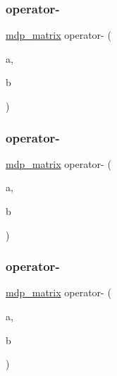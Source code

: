 \mbox{\label{classmdp__matrix_a60f405280a02350fdc22b1b8b86712c6}} 
\subsubsection{\texorpdfstring{operator-\/}{operator-}\hspace{0.1cm}{\footnotesize\ttfamily [2/6]}}
{\footnotesize\ttfamily \hyperlink{classmdp__matrix}{mdp\+\_\+matrix} operator-\/ (\begin{DoxyParamCaption}\item[{const \hyperlink{classmdp__matrix}{mdp\+\_\+matrix} \&}]{a,  }\item[{const \hyperlink{classmdp__matrix}{mdp\+\_\+matrix} \&}]{b }\end{DoxyParamCaption})\hspace{0.3cm}{\ttfamily [friend]}}

\mbox{\label{classmdp__matrix_ad5af014fcf319974b767e466ebbe0a41}} 
\subsubsection{\texorpdfstring{operator-\/}{operator-}\hspace{0.1cm}{\footnotesize\ttfamily [3/6]}}
{\footnotesize\ttfamily \hyperlink{classmdp__matrix}{mdp\+\_\+matrix} operator-\/ (\begin{DoxyParamCaption}\item[{const \hyperlink{classmdp__matrix}{mdp\+\_\+matrix} \&}]{a,  }\item[{\hyperlink{classmdp__complex}{mdp\+\_\+complex}}]{b }\end{DoxyParamCaption})\hspace{0.3cm}{\ttfamily [friend]}}

\mbox{\label{classmdp__matrix_a505c39c420588b8e6d1071a01509ed43}} 
\subsubsection{\texorpdfstring{operator-\/}{operator-}\hspace{0.1cm}{\footnotesize\ttfamily [4/6]}}
{\footnotesize\ttfamily \hyperlink{classmdp__matrix}{mdp\+\_\+matrix} operator-\/ (\begin{DoxyParamCaption}\item[{\hyperlink{classmdp__complex}{mdp\+\_\+complex}}]{a,  }\item[{const \hyperlink{classmdp__matrix}{mdp\+\_\+matrix} \&}]{b }\end{DoxyParamCaption})\hspace{0.3cm}{\ttfamily [friend]}}

